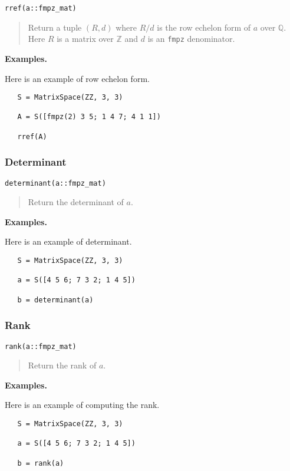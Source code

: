 \documentclass[a4paper,10pt]{article}
\newcommand{\Z}{\mathbb{Z}}
\newcommand{\Q}{\mathbb{Q}}
\newcommand{\code}{\lstinline}
\newcommand{\desc}[1]{\vspace{-3mm}\begin{quote}#1\end{quote}}
\begin{document}
{{\begin{lstlisting}
rref(a::fmpz_mat)
\end{lstlisting}

\desc{Return a tuple $(R, d)$ where $R/d$ is the row echelon form of $a$ over $\Q$.
Here $R$ is a matrix over $\Z$ and $d$ is an \code{fmpz} denominator.}

\textbf{Examples.}

Here is an example of row echelon form.

\begin{lstlisting}
   S = MatrixSpace(ZZ, 3, 3)

   A = S([fmpz(2) 3 5; 1 4 7; 4 1 1])
   
   rref(A)
\end{lstlisting}

\subsubsection{Determinant}

\begin{lstlisting}
determinant(a::fmpz_mat)
\end{lstlisting}

\desc{Return the determinant of $a$.}

\textbf{Examples.}

Here is an example of determinant.

\begin{lstlisting}
   S = MatrixSpace(ZZ, 3, 3)

   a = S([4 5 6; 7 3 2; 1 4 5])

   b = determinant(a)
\end{lstlisting}

\subsubsection{Rank}

\begin{lstlisting}
rank(a::fmpz_mat)
\end{lstlisting}

\desc{Return the rank of $a$.}

\textbf{Examples.}

Here is an example of computing the rank.

\begin{lstlisting}
   S = MatrixSpace(ZZ, 3, 3)

   a = S([4 5 6; 7 3 2; 1 4 5])

   b = rank(a)
\end{lstlisting}

}}
\end{document}
